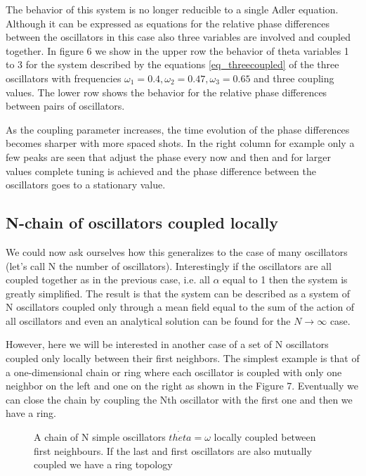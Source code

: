 \documentclass{article}
\begin{document}
The behavior of this system is no longer reducible to a single Adler equation. 
Although it can be expressed as equations for the relative phase differences between the oscillators in this case also three variables are involved and coupled together. 
In figure 6 we show in the upper row the behavior of theta variables 1 to 3 for the system described by the equations \ref{eq_threecoupled} of the three oscillators with frequencies $\omega_1=0.4,\omega_2=0.47,\omega_3=0.65$ and three coupling values. 
The lower row shows the behavior for the relative phase differences between pairs of oscillators.

As the coupling parameter increases, the time evolution of the phase differences becomes sharper with more spaced shots. 
In the right column for example only a few peaks are seen that adjust the phase every now and then and for larger values complete tuning is achieved and the phase difference between the oscillators goes to a stationary value.

\newpage

\subsection{N-chain of oscillators coupled locally}

We could now ask ourselves how this generalizes to the case of many oscillators (let's call N the number of oscillators). 
Interestingly if the oscillators are all coupled together as in the previous case, i.e. all $\alpha$ equal to 1 then the system is greatly simplified. 
The result is that the system can be described as a system of N oscillators coupled only through a mean field equal to the sum of the action of all oscillators and even an analytical solution can be found for the $N \rightarrow \infty$ case.

However,  here we will be interested in another case of a set of N oscillators coupled only locally between their first neighbors. 
The simplest example is that of a one-dimensional chain or ring where each oscillator is coupled with only one neighbor on the left and one on the right as shown in the Figure 7. 
Eventually we can close the chain by coupling the Nth oscillator with the first one and then we have a ring. 

\begin{figure} [h]
    \centerline{}
    \caption{A chain of N simple oscillators $\dot{theta}=\omega$ locally coupled between first neighbours. If the last and first oscillators are also mutually coupled we have a ring topology}
    \label{fig_threecoupled}
\end{figure}
\end{document}
